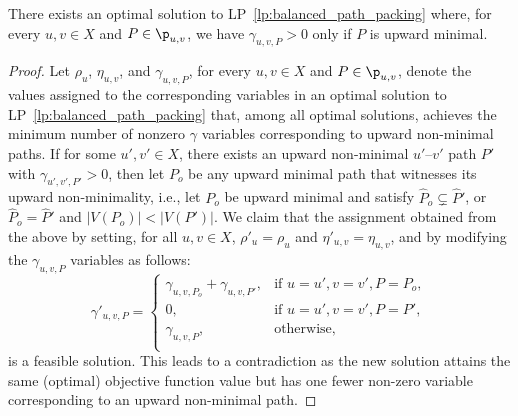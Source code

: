 \begin{lemma}\label{lem:upward_minimal_is_support}
    There exists an optimal solution to LP~\ref{lp:balanced_path_packing} where, for every $u,v\in X$ and $P\in \p_{u,v}$, we have $\gamma_{u,v,P} > 0$ only if $P$ is upward minimal.
\end{lemma}
\begin{proof}
    Let $\rho_u$, $\eta_{u,v}$, and $\gamma_{u,v,P}$, for every $u,v \in X$ and $P \in \p_{u,v}$, denote the values assigned to the corresponding variables in an optimal solution to LP~\ref{lp:balanced_path_packing} that, among all optimal solutions, achieves the minimum number of nonzero $\gamma$ variables corresponding to upward non-minimal paths. If for some $u',v'\in X$, there exists an upward non-minimal $u'$--$v'$ path $P'$ with $\gamma_{u',v',P'} > 0$, then let $P_o$ be any upward minimal path that witnesses its upward non-minimality, i.e., let $P_o$ be upward minimal and satisfy $\widehat{P}_o \subsetneq \widehat{P}'$, or $\widehat{P}_o = \widehat{P}'$ and $|V(P_o)| < |V(P')|$. 
    We claim that the assignment obtained from the above by setting, for all $u, v \in X$, $\rho'_u = \rho_u$ and $\eta'_{u,v} = \eta_{u,v}$, and by modifying the $\gamma_{u,v,P}$ variables as follows:
    $$
    \gamma'_{u,v,P} = 
    \begin{cases}
    \gamma_{u,v,P_o} + \gamma_{u,v,P'}, & \text{if }u = u', v = v', P = P_o, \\
    0, & \text{if } u = u', v = v', P = P',\\
    \gamma_{u,v,P}, & \text{otherwise}, \\
    \end{cases}
    $$
    is a feasible solution. This leads to a contradiction as the new solution attains the same (optimal) objective function value but has one fewer non-zero variable corresponding to an upward non-minimal path. 


\end{proof}
